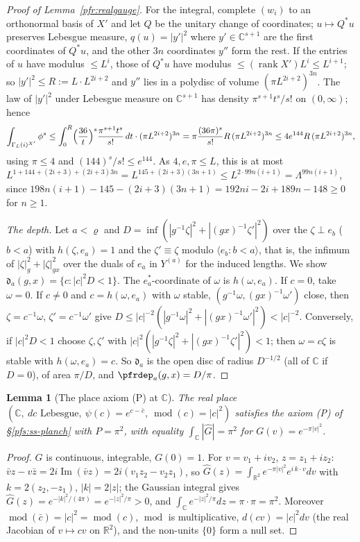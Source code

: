 \documentclass[10pt]{amsart}
\newtheorem{lemma}[theorem]{Lemma}
\theoremstyle{definition}
\theoremstyle{remark}
\newcommand{\C}{\mathbb C}
\newcommand{\R}{\mathbb R}
\newcommand{\Iml}{\operatorname{Im}}
\begin{document}
\begin{proof}[Proof of Lemma~\ref{pfr:realgauge}]
For the integral, complete $(w_i)$ to an orthonormal basis of $X'$ and let $Q$ be the unitary change of
coordinates; $u\mapsto Q^*u$ preserves Lebesgue measure, $q(u)=|y'|^2$ where $y'\in\C^{s+1}$ are the first
coordinates of $Q^*u$, and the other $3n$ coordinates $y''$ form the rest. If the entries of $u$ have
modulus $\le L^i$, those of $Q^*u$ have modulus $\le(\operatorname{rank}X')L^i\le L^{i+1}$; so $|y'|^2\le R:=
L\cdot L^{2i+2}$ and $y''$ lies in a polydisc of volume $(\pi L^{2i+2})^{3n}$. The law of $|y'|^2$ under
Lebesgue measure on $\C^{s+1}$ has density $\pi^{s+1}t^s/s!$ on $(0,\infty)$; hence
\[
\int_{\Gamma_L(i)^{X'}}\phi^s\le\int_0^R\Bigl(\frac{36}t\Bigr)^s\frac{\pi^{s+1}t^s}{s!}\,dt\cdot(\pi
L^{2i+2})^{3n}=\pi\frac{(36\pi)^s}{s!}R\,(\pi L^{2i+2})^{3n}\le4e^{144}R\,(\pi L^{2i+2})^{3n},
\]
using $\pi\le4$ and $(144)^s/s!\le e^{144}$. As $4,e,\pi\le L$, this is at most
$L^{1+144+(2i+3)+(2i+3)3n}=L^{145+(2i+3)(3n+1)}\le L^{2\cdot99n(i+1)}=\Lambda^{99n(i+1)}$, since
$198n(i+1)-145-(2i+3)(3n+1)=192ni-2i+189n-148\ge0$ for $n\ge1$.

\emph{The depth.} Let $a<\varrho$ and $D=\inf(|g^{-1}\zeta|^2+|(gx)^{-1}\zeta'|^2)$ over the $\zeta\perp e_b$
($b<a$) with $h(\zeta,e_a)=1$ and the $\zeta'\equiv\zeta$ modulo $\langle e_b:b<a\rangle$, that is, the
infimum of $|\zeta|_g^2+|\zeta|_{gx}^2$ over the duals of $e_a$ in $Y^{(a)}$ for the induced lengths. We
show $\mathfrak d_a(g,x)=\{c:|c|^2D<1\}$. The $e_a^*$-coordinate of $\omega$ is $h(\omega,e_a)$. If $c=0$,
take $\omega=0$. If $c\ne0$ and $c=h(\omega,e_a)$ with $\omega$ stable, $(g^{-1}\omega,(gx)^{-1}\omega')$ close, then
$\zeta=c^{-1}\omega$, $\zeta'=c^{-1}\omega'$ give $D\le|c|^{-2}(|g^{-1}\omega|^2+|(gx)^{-1}\omega'|^2)<|c|^{-2}$.
Conversely, if $|c|^2D<1$ choose $\zeta,\zeta'$ with $|c|^2(|g^{-1}\zeta|^2+|(gx)^{-1}\zeta'|^2)<1$; then
$\omega=c\zeta$ is stable with $h(\omega,e_a)=c$. So $\mathfrak d_a$ is the open disc of radius $D^{-1/2}$ (all of
$\C$ if $D=0$), of area $\pi/D$, and $\pfrdep_a(g,x)=D/\pi$.
\end{proof}

\begin{lemma}[The place axiom (P) at $\C$]\label{prp:planch}
The real place $(\C,\ dc\text{ Lebesgue},\ \psi(c)=e^{c-\bar c},\ \operatorname{mod}(c)=|c|^2)$ satisfies the axiom
\textup{(P)} of \S\ref{pfs:ss-planch} with $P=\pi^2$, with equality $\int_\C|\widehat G|=\pi^2$ for $G(v)=e^{-\pi|v|^2}$.
\end{lemma}
\begin{proof}
$G$ is continuous, integrable, $G(0)=1$. For $v=v_1+iv_2$, $z=z_1+iz_2$: $\bar vz-v\bar z=2i\Iml(\bar vz)=
2i(v_1z_2-v_2z_1)$, so $\widehat G(z)=\int_{\R^2}e^{-\pi|v|^2}e^{i\,k\cdot v}dv$ with $k=2(z_2,-z_1)$, $|k|=2|z|$; the
Gaussian integral gives $\widehat G(z)=e^{-|k|^2/(4\pi)}=e^{-|z|^2/\pi}>0$, and $\int_\C e^{-|z|^2/\pi}dz=\pi\cdot\pi=\pi^2$.
Moreover $\operatorname{mod}(\bar c)=|c|^2=\operatorname{mod}(c)$, $\operatorname{mod}$ is multiplicative, $d(cv)=|c|^2dv$
(the real Jacobian of $v\mapsto cv$ on $\R^2$), and the non-units $\{0\}$ form a null set.
\end{proof}
\end{document}
